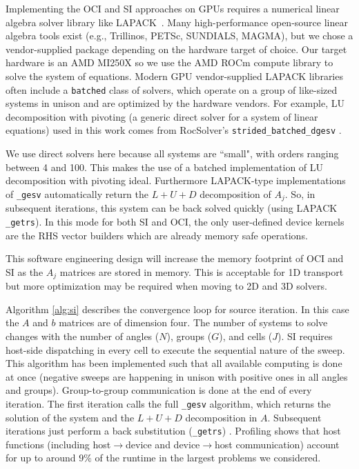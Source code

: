 

Implementing the OCI and SI approaches on GPUs requires a numerical linear algebra solver library like LAPACK~\cite{laug}.
Many high-performance open-source linear algebra tools exist (e.g., Trillinos, PETSc, SUNDIALS, MAGMA), but we chose a vendor-supplied package depending on the hardware target of choice.
Our target hardware is an AMD MI250X so we use the AMD ROCm compute library to solve the system of equations.
Modern GPU vendor-supplied LAPACK libraries often include a \texttt{batched} class of solvers,
which operate on a group of like-sized systems in unison and are optimized by the hardware vendors.
For example, LU decomposition with pivoting (a generic direct solver for a system of linear equations) used in this work comes from RocSolver's \texttt{strided\_batched\_dgesv} \cite{rocsolver}.

We use direct solvers here because all systems are ``small", with orders ranging between 4 and 100.
This makes the use of a batched implementation of LU decomposition with pivoting ideal.
Furthermore LAPACK-type implementations of \texttt{\_gesv} automatically return the $L+U+D$ decomposition of $A_j$.
So, in subsequent iterations, this system can be back solved quickly (using LAPACK \texttt{\_getrs}).
In this mode for both SI and OCI, the only user-defined device kernels are the RHS vector builders which are already memory safe operations.

This software engineering design will increase the memory footprint of OCI and SI as the $A_j$ matrices are stored in memory.
This is acceptable for 1D transport but more optimization may be required when moving to 2D and 3D solvers.

Algorithm \ref{alg:si} describes the convergence loop for source iteration.
In this case the $A$ and $b$ matrices are of dimension four.
The number of systems to solve changes with the number of angles ($N$), groups ($G$), and cells ($J$).
SI requires host-side dispatching in every cell to execute the sequential nature of the sweep.
This algorithm has been implemented such that all available computing is done at once (negative sweeps are happening in unison with positive ones in all angles and groups).
Group-to-group communication is done at the end of every iteration.
The first iteration calls the full \texttt{\_gesv} algorithm, which returns the solution of the system and the $L+U+D$ decomposition in $A$.
Subsequent iterations just perform a back substitution (\texttt{\_getrs}) .
Profiling shows that host functions (including host$\rightarrow$device and device$\rightarrow$host communication) account for up to around $9\%$ of the runtime in the largest problems we considered.


